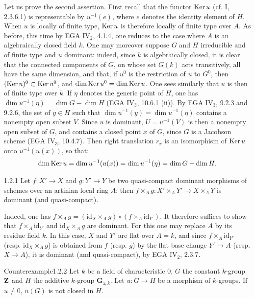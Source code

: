 Let us prove the second assertion. First recall that the functor $\operatorname{Ker} u$ (cf. I, 2.3.6.1) is representable by $u^{-1}(e)$, where $e$ denotes the identity element of $H$. When $u$ is locally of finite type, $\operatorname{Ker} u$ is therefore locally of finite type over $A$. As before, this time by EGA IV$_2$, 4.1.4, one reduces to the case where $A$ is an algebraically closed field $k$. One may moreover suppose $G$ and $H$ irreducible and of finite type and $u$ dominant: indeed, since $k$ is algebraically closed, it is clear that the connected components of $G$, on whose set $G(k)$ acts transitively, all have the same dimension, and that, if $u^0$ is the restriction of $u$ to $G^0$, then $(\operatorname{Ker} u)^0\subset\operatorname{Ker} u^0$, and $\dim\operatorname{Ker} u^0=\dim\operatorname{Ker} u$. One sees similarly that $u$ is then of finite type over $k$. If $\eta$ denotes the generic point of $H$, one has $\dim u^{-1}(\eta)=\dim G-\dim H$ (EGA IV$_3$, 10.6.1 (ii)). By EGA IV$_3$, 9.2.3 and 9.2.6, the set of $y\in H$ such that $\dim u^{-1}(y)=\dim u^{-1}(\eta)$ contains a nonempty open subset $V$. Since $u$ is dominant, $U=u^{-1}(V)$ is then a nonempty open subset of $G$, and contains a closed point $x$ of $G$, since $G$ is a Jacobson scheme (EGA IV$_3$, 10.4.7). Then right translation $r_x$ is an isomorphism of $\operatorname{Ker} u$ onto $u^{-1}(u(x))$, so that:
\[
\dim\operatorname{Ker} u=\dim u^{-1}(u(x))=\dim u^{-1}(\eta)=\dim G-\dim H.
\]
\begin{lemma}{1.2.1}\label{VIB.1.2.1}
Let $f:X'\to X$ and $g:Y'\to Y$ be two quasi-compact dominant morphisms of schemes over an artinian local ring $A$; then $f\times_Ag:X'\times_AY'\to X\times_AY$ is dominant (and quasi-compact).
\end{lemma}
Indeed, one has $f\times_Ag=(\mathrm{id}_X\times_Ag)\circ(f\times_A\mathrm{id}_{Y'})$. It therefore suffices to show that $f\times_A\mathrm{id}_{Y'}$ and $\mathrm{id}_X\times_Ag$ are dominant. For this one may replace $A$ by its residue field $k$. In this case, $X$ and $Y'$ are flat over $A=k$, and since $f\times_A\mathrm{id}_{Y'}$ (resp. $\mathrm{id}_X\times_Ag$) is obtained from $f$ (resp. $g$) by the flat base change $Y'\to A$ (resp. $X\to A$), it is dominant (and quasi-compact), by EGA IV$_2$, 2.3.7.
\begin{enoncerm}{Counterexample}{1.2.2}\label{VIB.1.2.2}
Let $k$ be a field of characteristic $0$, $G$ the constant $k$-group $\mathbf{Z}$ and $H$ the additive $k$-group $\mathbf G_{\mathrm a,k}$. Let $u:G\to H$ be a morphism of $k$-groups. If $u\ne0$, $u(G)$ is not closed in $H$.
\end{enoncerm}
